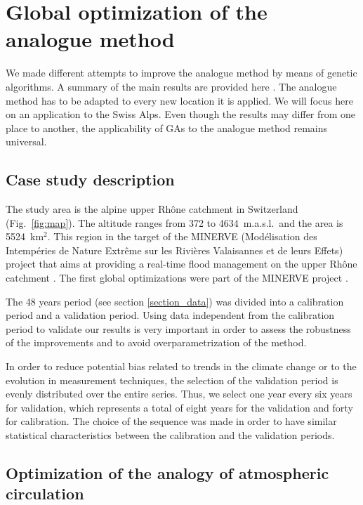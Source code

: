\documentclass[twocol]{ametsoc}
\begin{document}
\section{Global optimization of the analogue method}

We made different attempts to improve the analogue method by means of genetic algorithms. A summary of the main results are provided here \citep[see][for the details]{Horton2012a}. The analogue method has to be adapted to every new location it is applied. We will focus here on an application to the Swiss Alps. Even though the results may differ from one place to another, the applicability of GAs to the analogue method remains universal.


\subsection{Case study description}

The study area is the alpine upper Rhône catchment in Switzerland (Fig.\ \ref{fig:map}). The altitude ranges from 372 to 4634~m.a.s.l.\ and the area is 5524~km$^{2}$. This region in the target of the MINERVE (Mod\'{e}lisation des Intemp\'{e}ries de Nature Extr\^{e}me sur les Rivi\`{e}res Valaisannes et de leurs Effets) project that aims at providing a real-time flood management on the upper Rh\^{o}ne catchment \citep{GarciaHernandez2009b}. The first global optimizations were part of the MINERVE project \citep{Horton2012, Horton2012a}.

The 48 years period (see section \ref{section_data}) was divided into a calibration period and a validation period. Using data independent from the calibration period to validate our results is very important in order to assess the robustness of the improvements and to avoid overparametrization of the method.

In order to reduce potential bias related to trends in the climate change or to the evolution in measurement techniques, the selection of the validation period is evenly distributed over the entire series. Thus, we select one year every six years for validation, which represents a total of eight years for the validation and forty for calibration. The choice of the sequence was made in order to have similar statistical characteristics between the calibration and the validation periods.


\subsection{Optimization of the analogy of atmospheric circulation}
\end{document}
